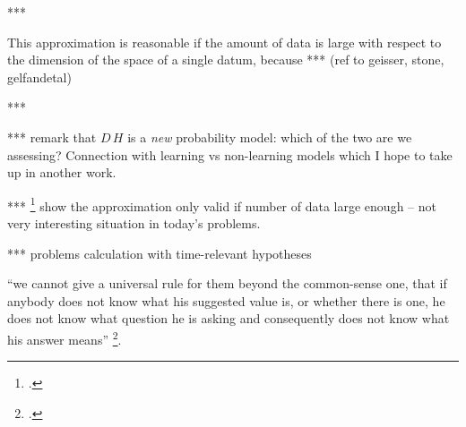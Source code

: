 \documentclass[\ifafour a4paper,12pt,\else a5paper,10pt,\fi%
onecolumn,oneside,article,%
british%
]{memoir}
\makeatletter
\theoremstyle{remark}
\theoremstyle{innote}
\def\sum{\DOTSI\sumop\slimits@}
\newcommand*{\citep}{\footcites}
\newcommand*{\de}{\partialup}%
\newcommand*{\p}{\mathrm{p}}%
\renewcommand*{\|}[1][]{\nonscript\:#1\vert\nonscript\:\mathopen{}}
\renewcommand*{\=}{\TextOrMath\texteq\eq}
\newcommand*{\sect}{\S}%
\newcommand*{\tsum}{\mathop{\textstyle\sum}\nolimits}
\makeatother
\begin{document}
***

This approximation is reasonable if the amount of data is large with
respect to the dimension of the space of a single datum, because *** (ref
to geisser, stone, gelfandetal)

***

*** remark that $D\,H$ is a \emph{new} probability model: which of the two
are we assessing? Connection with learning vs non-learning models which I
hope to take up in another work.

***  \citep[\sect~6.1.6]{bernardoetal1994} show the approximation only
valid if number of data large enough -- not very interesting situation in
today's problems.


*** problems calculation with time-relevant hypotheses


\enquote{we cannot give a universal rule for them beyond the common-sense one, that if anybody does not know what his suggested value is, or whether there is one, he does not know what question he is asking and consequently does not know what his answer means} \citep[\sect~3.1 p.~124 ]{jeffreys1939_r1983}.









\end{document}
